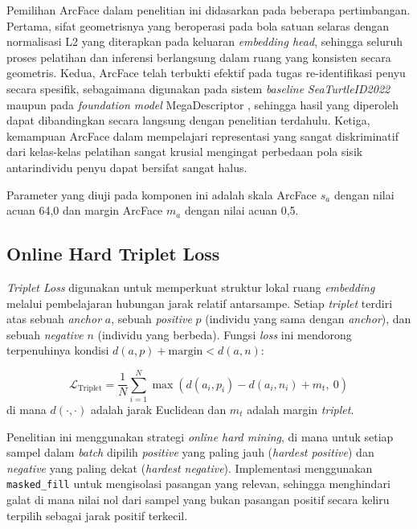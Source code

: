 Pemilihan ArcFace dalam penelitian ini didasarkan pada beberapa pertimbangan. Pertama, sifat geometrisnya yang beroperasi pada bola satuan selaras dengan normalisasi L2 yang diterapkan pada keluaran \textit{embedding head}, sehingga seluruh proses pelatihan dan inferensi berlangsung dalam ruang yang konsisten secara geometris. Kedua, ArcFace telah terbukti efektif pada tugas re-identifikasi penyu secara spesifik, sebagaimana digunakan pada sistem \textit{baseline} \textit{SeaTurtleID2022} \cite{adam2023seaturtleid2022} maupun pada \textit{foundation model} MegaDescriptor \cite{cermak2024wildlifedatasets}, sehingga hasil yang diperoleh dapat dibandingkan secara langsung dengan penelitian terdahulu. Ketiga, kemampuan ArcFace dalam mempelajari representasi yang sangat diskriminatif dari kelas-kelas pelatihan sangat krusial mengingat perbedaan pola sisik antarindividu penyu dapat bersifat sangat halus.

Parameter yang diuji pada komponen ini adalah skala ArcFace $s_a$ dengan nilai acuan 64,0 dan margin ArcFace $m_a$ dengan nilai acuan 0,5.

\subsection{Online Hard Triplet Loss}

\textit{Triplet Loss} digunakan untuk memperkuat struktur lokal ruang \textit{embedding} melalui pembelajaran hubungan jarak relatif antarsampe. Setiap \textit{triplet} terdiri atas sebuah \textit{anchor} $a$, sebuah \textit{positive} $p$ (individu yang sama dengan \textit{anchor}), dan sebuah \textit{negative} $n$ (individu yang berbeda). Fungsi \textit{loss} ini mendorong terpenuhinya kondisi $d(a,p) + \text{margin} < d(a,n)$:

\begin{equation}
    \mathcal{L}_{\text{Triplet}} = \frac{1}{N} \sum_{i=1}^{N} \max\!\left(d(a_i, p_i) - d(a_i, n_i) + m_t,\ 0\right)
\end{equation}
di mana $d(\cdot, \cdot)$ adalah jarak Euclidean dan $m_t$ adalah margin \textit{triplet}.

Penelitian ini menggunakan strategi \textit{online hard mining}, di mana untuk setiap sampel dalam \textit{batch} dipilih \textit{positive} yang paling jauh (\textit{hardest positive}) dan \textit{negative} yang paling dekat (\textit{hardest negative}). Implementasi menggunakan \texttt{masked\_fill} untuk mengisolasi pasangan yang relevan, sehingga menghindari galat di mana nilai nol dari sampel yang bukan pasangan positif secara keliru terpilih sebagai jarak positif terkecil.

